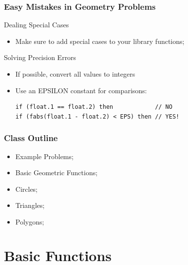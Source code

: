 \documentclass{beamer}
\begin{document}
\begin{frame}[fragile]
  \frametitle{Easy Mistakes in Geometry Problems}

  {\smaller

    \begin{block}{Dealing Special Cases}
      \begin{itemize}
      \item Make sure to add special cases to your
        library functions;
      \end{itemize}
    \end{block}

    \begin{block}{Solving Precision Errors}
      \begin{itemize}
      \item If possible, convert all values to integers
      \item Use an EPSILON constant for comparisons:

\begin{verbatim}
if (float.1 == float.2) then            // NO
if (fabs(float.1 - float.2) < EPS) then // YES!
\end{verbatim}

      \end{itemize}
    \end{block}
  }
\end{frame}

\begin{frame}
  \frametitle{Class Outline}
  \begin{itemize}
  \item Example Problems;
  \item Basic Geometric Functions;
  \item Circles;
  \item Triangles;
  \item Polygons;
  \end{itemize}
\end{frame}



\section{Basic Functions}
\end{document}
